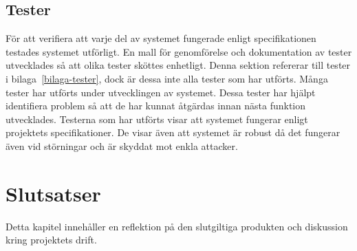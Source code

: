 \documentclass[a4paper]{article}
\begin{document}
\subsection{Tester}
För att verifiera att varje del av systemet fungerade enligt specifikationen testades systemet utförligt.
En mall för genomförelse och dokumentation av tester utvecklades så att olika tester sköttes enhetligt.
Denna sektion refererar till tester i bilaga~\ref{bilaga-tester}, dock är dessa inte alla tester som har utförts.
Många tester har utförts under utvecklingen av systemet.
Dessa tester har hjälpt identifiera problem så att de har kunnat åtgärdas innan nästa funktion utvecklades.
Testerna som har utförts visar att systemet fungerar enligt projektets specifikationer.
De visar även att systemet är robust då det fungerar även vid störningar och är skyddat mot enkla attacker.

\newpage
\section{Slutsatser}
Detta kapitel innehåller en reflektion på den slutgiltiga produkten och diskussion kring projektets drift.
\end{document}
